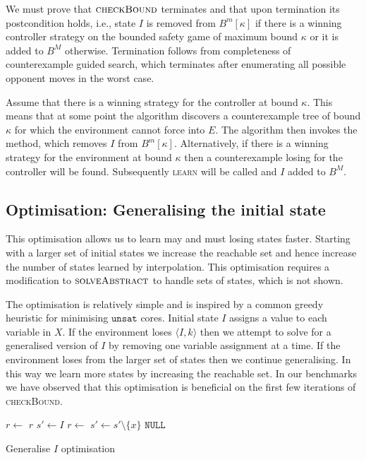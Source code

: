 We must prove that $\textsc{checkBound}$ terminates and that upon termination
its postcondition holds, i.e., state $I$ is removed from $B^m[\kappa]$ if there
is a winning controller strategy on the bounded safety game of maximum bound
$\kappa$ or it is added to $B^M$ otherwise. Termination follows from
completeness of counterexample guided search, which terminates after
enumerating all possible opponent moves in the worst case.

Assume that there is a winning strategy for the controller at bound $\kappa$.
This means that at some point the algorithm discovers a counterexample tree of
bound $\kappa$ for which the environment cannot force into $E$. The algorithm
then invokes the \textsc{} method, which removes $I$ from
$B^m[\kappa]$.  Alternatively, if there is a winning strategy for the
environment at bound $\kappa$ then a counterexample losing for the controller
will be found.  Subsequently \textsc{learn} will be called and $I$ added to
$B^M$.

\subsection{Optimisation: Generalising the initial state}

This optimisation allows us to learn may and must losing states faster.
Starting with a larger set of initial states we increase the reachable set and
hence increase the number of states learned by interpolation. This optimisation
requires a modification to $\textsc{solveAbstract}$ to handle sets of states,
which is not shown.

The optimisation is relatively simple and is inspired by a common greedy
heuristic for minimising $\texttt{unsat}$ cores. Initial state $I$ assigns a value to
each variable in $X$. If the environment loses $\langle I, k
\rangle$ then we attempt to solve for a generalised version of $I$ by removing
one variable assignment at a time. If the environment loses from the larger set of
states then we continue generalising. In this way we learn more
states by increasing the reachable set. In our benchmarks we have observed that
this optimisation is beneficial on the first few iterations of
\textsc{checkBound}.

\begin{algorithm}
    \begin{algorithmic}
            \State $r \gets $ 
             \Return $r$ \EndIIf
            \State $s' \gets I$
            \State $r \gets$  
                 $s' \gets s' \setminus \{x\}$ \EndIIf {}
            \EndFor
            \State \Return $\texttt{NULL}$
        \EndFunction
    \end{algorithmic}
    \caption{Generalise $I$ optimisation}
    \label{alg:opt1}
\end{algorithm}
